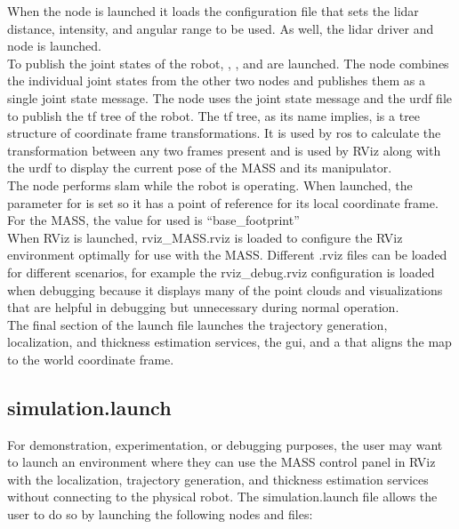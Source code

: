 When the  node is launched it loads the configuration file that sets the \acrshort{lidar} distance, intensity, and angular range to be used. As well, the \acrshort{lidar} driver and  node is launched.\\

To publish the joint states of the robot, , , and  are launched. The  node combines the individual joint states from the other two nodes and publishes them as a single joint state message. The node  uses the joint state message and the \acrshort{urdf} file to publish the tf tree of the robot. The tf tree, as its name implies, is a tree structure of coordinate frame transformations. It is used by \acrshort{ros} to calculate the transformation between any two frames present and is used by RViz along with the \acrshort{urdf} to display the current pose of the MASS and its manipulator.\\

The node  performs \acrshort{slam} while the robot is operating. When launched, the parameter for  is set so it has a point of reference for its local coordinate frame. For the MASS, the value for  used is ``base\_footprint''\\

When RViz is launched, rviz\_MASS.rviz is loaded to configure the RViz environment optimally for use with the MASS. Different .rviz files can be loaded for different scenarios, for example the rviz\_debug.rviz configuration is loaded when debugging because it displays many of the point clouds and visualizations that are helpful in debugging but unnecessary during normal operation.\\

The final section of the launch file launches the trajectory generation, localization, and thickness estimation services, the  \acrshort{gui}, and a  that aligns the map to the world coordinate frame.\\

\subsection{simulation.launch}

For demonstration, experimentation, or debugging purposes, the user may want to launch an environment where they can use the MASS control panel in RViz with the localization, trajectory generation, and thickness estimation services without connecting to the physical robot. The simulation.launch file allows the user to do so by launching the following nodes and files:

